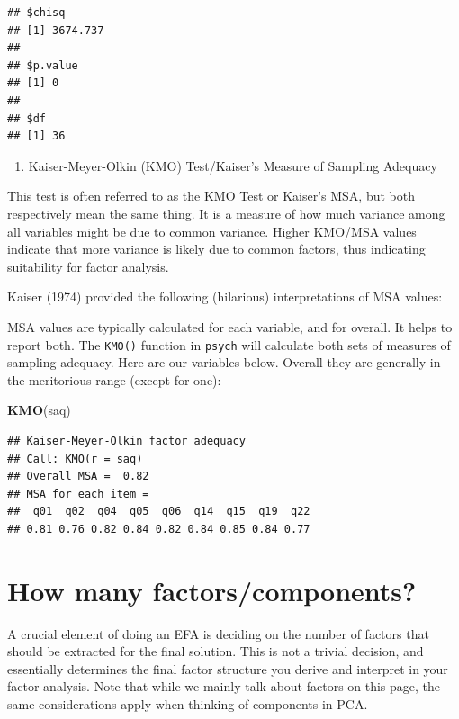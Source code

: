 \documentclass[
]{book}
\newenvironment{Shaded}{\begin{snugshade}}{\end{snugshade}}
\newcommand{\FunctionTok}[1]{\textcolor[rgb]{0.13,0.29,0.53}{\textbf{#1}}}
\newcommand{\NormalTok}[1]{#1}
\providecommand{\tightlist}{%
  \setlength{\itemsep}{0pt}\setlength{\parskip}{0pt}}
\begin{document}
\begin{verbatim}
## $chisq
## [1] 3674.737
## 
## $p.value
## [1] 0
## 
## $df
## [1] 36
\end{verbatim}

\begin{enumerate}
\def\labelenumi{\arabic{enumi}.}
\setcounter{enumi}{2}
\tightlist
\item
  Kaiser-Meyer-Olkin (KMO) Test/Kaiser's Measure of Sampling Adequacy
\end{enumerate}

This test is often referred to as the KMO Test or Kaiser's MSA, but both respectively mean the same thing. It is a measure of how much variance among all variables might be due to common variance. Higher KMO/MSA values indicate that more variance is likely due to common factors, thus indicating suitability for factor analysis.

Kaiser (1974) provided the following (hilarious) interpretations of MSA values:

MSA values are typically calculated for each variable, and for overall. It helps to report both. The \texttt{KMO()} function in \texttt{psych} will calculate both sets of measures of sampling adequacy. Here are our variables below. Overall they are generally in the meritorious range (except for one):

\begin{Shaded}
\begin{Highlighting}[]
\FunctionTok{KMO}\NormalTok{(saq)}
\end{Highlighting}
\end{Shaded}

\begin{verbatim}
## Kaiser-Meyer-Olkin factor adequacy
## Call: KMO(r = saq)
## Overall MSA =  0.82
## MSA for each item = 
##  q01  q02  q04  q05  q06  q14  q15  q19  q22 
## 0.81 0.76 0.82 0.84 0.82 0.84 0.85 0.84 0.77
\end{verbatim}

\hypertarget{how-many-factorscomponents}{%
\section{How many factors/components?}\label{how-many-factorscomponents}}

A crucial element of doing an EFA is deciding on the number of factors that should be extracted for the final solution. This is not a trivial decision, and essentially determines the final factor structure you derive and interpret in your factor analysis.
Note that while we mainly talk about factors on this page, the same considerations apply when thinking of components in PCA.
\end{document}
